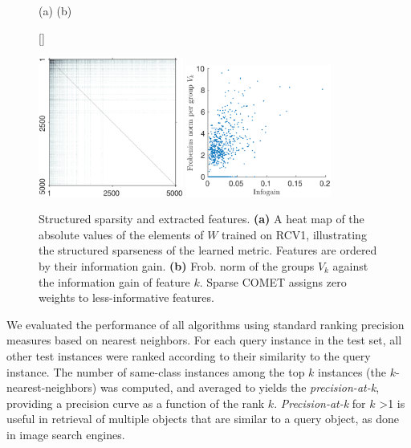 \documentclass[twoside,11pt]{article}
\newcommand\mat[1]{{#1}}
\newcommand{\W}{\mat{W}}
\newcommand{\Vk}{\mat{V_k}}
\newcommand{\Vgrc}{\{\Vk\}_{k=1}^{d}} %
\begin{document}
\begin{figure}[ht]
    \centerline{
    (a) \hspace{160pt} (b) \hspace{260pt} \newline{}
    }
    \captionsetup{font=small}
    [\FBwidth]
    {\caption{Structured sparsity and extracted features. {\bf (a)} A heat map of the absolute values of the elements of $\W$ trained on RCV1, illustrating the structured sparseness of the learned metric. Features are ordered by their information gain.  {\bf (b)} Frob. norm of the groups $V_k$ against the information gain of feature $k$. Sparse COMET assigns zero weights to less-informative features.}\label{fig:spmatrix}}
{
 \includegraphics[trim=0 -0.75cm 0 0,width=4.75cm]{sparse_W_visualization}
 \includegraphics[trim=0 0cm 0 0,width=4.75cm]{V_features_vs_infogain}

}
\vskip -10pt
\end{figure}


We evaluated the performance of all algorithms using standard ranking precision measures based on nearest neighbors. For each query instance in the test set, all other test instances were ranked according to their similarity to the query instance. The number of same-class instances among the top $k$ instances (the $k$-nearest-neighbors) was computed, and averaged to  yields the \textit{precision-at-k}, providing a precision curve as a function of the rank $k$. \textit{Precision-at-k} for $k$ >1 is useful in retrieval of multiple objects that are similar to a query object, as done in image search engines.
\end{document}
